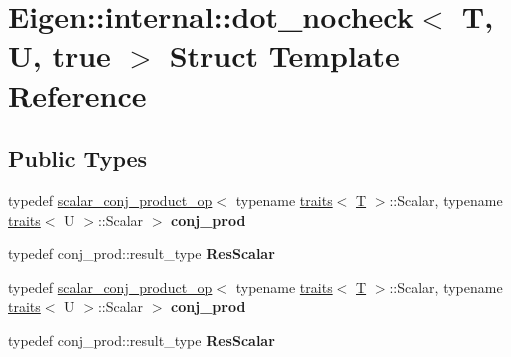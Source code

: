 \hypertarget{struct_eigen_1_1internal_1_1dot__nocheck_3_01_t_00_01_u_00_01true_01_4}{}\section{Eigen\+:\+:internal\+:\+:dot\+\_\+nocheck$<$ T, U, true $>$ Struct Template Reference}
\label{struct_eigen_1_1internal_1_1dot__nocheck_3_01_t_00_01_u_00_01true_01_4}
\subsection*{Public Types}
\begin{DoxyCompactItemize}
\item 
\mbox{\label{struct_eigen_1_1internal_1_1dot__nocheck_3_01_t_00_01_u_00_01true_01_4_af46c6f58464fb29fbf8da63fd2f12f8a}} 
typedef \hyperlink{struct_eigen_1_1internal_1_1scalar__conj__product__op}{scalar\+\_\+conj\+\_\+product\+\_\+op}$<$ typename \hyperlink{struct_eigen_1_1internal_1_1traits}{traits}$<$ \hyperlink{group___sparse_core___module}{T} $>$\+::Scalar, typename \hyperlink{struct_eigen_1_1internal_1_1traits}{traits}$<$ U $>$\+::Scalar $>$ {\bfseries conj\+\_\+prod}
\item 
\mbox{\label{struct_eigen_1_1internal_1_1dot__nocheck_3_01_t_00_01_u_00_01true_01_4_adcd4282d8e49e661ed8e123f92bdb308}} 
typedef conj\+\_\+prod\+::result\+\_\+type {\bfseries Res\+Scalar}
\item 
\mbox{\label{struct_eigen_1_1internal_1_1dot__nocheck_3_01_t_00_01_u_00_01true_01_4_af46c6f58464fb29fbf8da63fd2f12f8a}} 
typedef \hyperlink{struct_eigen_1_1internal_1_1scalar__conj__product__op}{scalar\+\_\+conj\+\_\+product\+\_\+op}$<$ typename \hyperlink{struct_eigen_1_1internal_1_1traits}{traits}$<$ \hyperlink{group___sparse_core___module}{T} $>$\+::Scalar, typename \hyperlink{struct_eigen_1_1internal_1_1traits}{traits}$<$ U $>$\+::Scalar $>$ {\bfseries conj\+\_\+prod}
\item 
\mbox{\label{struct_eigen_1_1internal_1_1dot__nocheck_3_01_t_00_01_u_00_01true_01_4_adcd4282d8e49e661ed8e123f92bdb308}} 
typedef conj\+\_\+prod\+::result\+\_\+type {\bfseries Res\+Scalar}
\end{DoxyCompactItemize}
